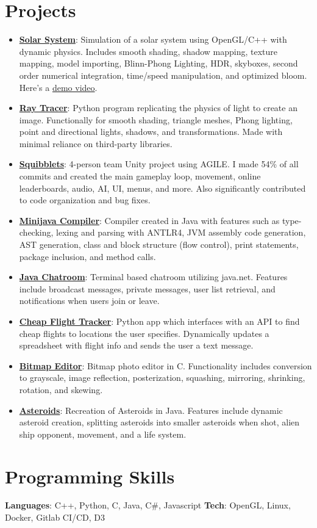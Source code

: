 \documentclass[letterpaper,11pt]{article}
\newcommand{\resumeItem}[2]{
  \item\small{
    \textbf{#1}{: #2 \vspace{-2pt}}
  }
}
\newcommand{\resumeSubItem}[2]{\resumeItem{#1}{#2}\vspace{-4pt}}
\newcommand{\resumeSubHeadingListStart}{\begin{itemize}[leftmargin=*]}
\newcommand{\resumeSubHeadingListEnd}{\end{itemize}}
\begin{document}
\section{Projects}
  \resumeSubHeadingListStart
    \resumeSubItem{\href{https://github.com/Nathan-Hutton/solar-system}{Solar System}}
      {Simulation of a solar system using OpenGL/C++ with dynamic physics. Includes smooth
shading, shadow mapping, texture mapping, model importing, Blinn-Phong Lighting, HDR, skyboxes, second order numerical integration, time/speed manipulation, and optimized bloom. Here's a \href{https://nathan-hutton.github.io/Portfolio/images/finalVideo.mp4}{demo video}.}
    \resumeSubItem{\href{https://github.com/Nathan-Hutton/Ray-Tracer}{Ray Tracer}}
      {Python program replicating the physics of light to create an image. Functionally for smooth
shading, triangle meshes, Phong lighting, point and directional lights, shadows, and transformations. Made with minimal reliance on third-party libraries.}
    \resumeSubItem{\href{https://github.com/CharlesBirdgv/Squibblets}{Squibblets}}
      {4-person team Unity project using AGILE. I made 54\% of all commits and created the main
gameplay loop, movement, online leaderboards, audio, AI, UI, menus, and more. Also significantly
contributed to code organization and bug fixes.}
    \resumeSubItem{\href{https://github.com/Nathan-Hutton/Minijava_Compiler_AST}{Minijava Compiler}}
    {Compiler created in Java with features such as type-checking, lexing and parsing
with ANTLR4, JVM assembly code generation, AST generation, class and block structure (flow control),
print statements, package inclusion, and method calls.}
    \resumeSubItem{\href{https://github.com/Nathan-Hutton/Chatroom}{Java Chatroom}}
    {Terminal based chatroom utilizing java.net. Features include broadcast messages, private messages, user list retrieval, and notifications when users join or leave.}
    \resumeSubItem{\href{https://github.com/Nathan-Hutton/Flight-Finder}{Cheap Flight Tracker}}
    {Python app which interfaces with an API to find cheap flights to locations the user
specifies. Dynamically updates a spreadsheet with flight info and sends the user a text message.}
    \resumeSubItem{\href{https://github.com/Nathan-Hutton/Bitmap-Editor}{Bitmap Editor}}
    {Bitmap photo editor in C. Functionality includes conversion to grayscale, image reflection, posterization, squashing, mirroring, shrinking, rotation, and skewing.}
    \resumeSubItem{\href{https://github.com/Nathan-Hutton/Asteroids}{Asteroids}}
    {Recreation of Asteroids in Java. Features include dynamic asteroid creation, splitting asteroids into smaller asteroids when shot, alien ship opponent, movement, and a life system.}
  \resumeSubHeadingListEnd

%
\section{Programming Skills}
 \textbf{Languages}{: C++, Python, C, Java, C\#, Javascript}
 \hfill
 \textbf{Tech}{: OpenGL, Linux, Docker, Gitlab CI/CD, D3}

\end{document}
